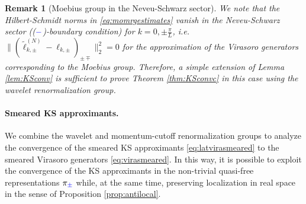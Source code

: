 \documentclass[a4paper, 11pt]{article}
\DeclareMathOperator{\1}{\mathds{1}}
\newtheorem{rem}[thm]{Remark}
\begin{document}
\begin{rem}[Moebius group in the Neveu-Schwarz sector]
\label{rem:moeberror}
We note that the Hilbert-Schmidt norms in \eqref{eq:momrgestimates} vanish in the Neveu-Schwarz sector ((${\color{blue}-}$)-boundary condition) for $k=0,\pm\tfrac{\pi}{L}$, i.e.~$\|(\tilde{\ell}^{(N)}_{k,\pm}-\ell_{k,\pm})_{\pm\mp}\|_{2}^{2}=0$ for the approximation of the Virasoro generators corresponding to the Moebius group. Therefore, a simple extension of Lemma \ref{lem:KSconv} is sufficient to prove Theorem \ref{thm:KSconvc} in this case using the wavelet renormalization group.
\end{rem}

\paragraph{Smeared KS approximants.}
\label{sec:KSsmeared}
We combine the wavelet and momentum-cutoff renormalization groups to analyze the convergence of the smeared KS approximants \eqref{eq:latvirasmeared} to the smeared Virasoro generators \eqref{eq:virasmeared}. In this way, it is possible to exploit the convergence of the KS approximants in the non-trivial quasi-free representations $\pi_{{\color{blue}\pm}}$ while, at the same time, preserving localization in real space in the sense of Proposition \ref{prop:antilocal}.

\bigskip
\end{document}
